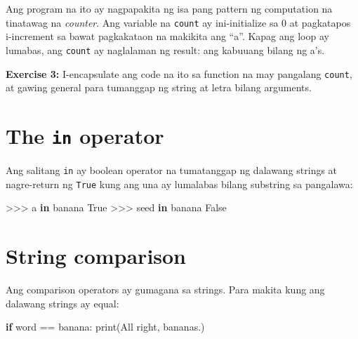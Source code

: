 \documentclass[10pt,]{book}
\newenvironment{Shaded}{}{}
\newcommand{\BuiltInTok}[1]{\textcolor[rgb]{0.00,0.50,0.00}{#1}}
\newcommand{\ControlFlowTok}[1]{\textcolor[rgb]{0.00,0.44,0.13}{\textbf{#1}}}
\newcommand{\KeywordTok}[1]{\textcolor[rgb]{0.00,0.44,0.13}{\textbf{#1}}}
\newcommand{\NormalTok}[1]{#1}
\newcommand{\OperatorTok}[1]{\textcolor[rgb]{0.40,0.40,0.40}{#1}}
\newcommand{\StringTok}[1]{\textcolor[rgb]{0.25,0.44,0.63}{#1}}
\newcommand{\VariableTok}[1]{\textcolor[rgb]{0.10,0.09,0.49}{#1}}
\begin{document}
Ang program na ito ay nagpapakita ng isa pang pattern ng computation na
tinatawag na \emph{counter}. Ang variable na \texttt{count} ay
ini-initialize sa 0 at pagkatapos i-increment sa bawat pagkakataon na
makikita ang ``a''. Kapag ang loop ay lumabas, ang \texttt{count} ay
naglalaman ng result: ang kabuuang bilang ng a's.


\textbf{Exercise 3:} I-encapsulate ang code na ito sa function na may
pangalang \texttt{count}, at gawing general para tumanggap ng string at
letra bilang arguments.

\section{\texorpdfstring{The \texttt{in}
operator}{The in operator}}\label{the-in-operator}

  

Ang salitang \texttt{in} ay boolean operator na tumatanggap ng dalawang
strings at nagre-return ng \texttt{True} kung ang una ay lumalabas
bilang substring sa pangalawa:

\begin{Shaded}
\begin{Highlighting}[]
\OperatorTok{\textgreater{}\textgreater{}\textgreater{}} \StringTok{\textquotesingle{}a\textquotesingle{}} \KeywordTok{in} \StringTok{\textquotesingle{}banana\textquotesingle{}}
\VariableTok{True}
\OperatorTok{\textgreater{}\textgreater{}\textgreater{}} \StringTok{\textquotesingle{}seed\textquotesingle{}} \KeywordTok{in} \StringTok{\textquotesingle{}banana\textquotesingle{}}
\VariableTok{False}
\end{Highlighting}
\end{Shaded}

\section{String comparison}\label{string-comparison}

 

Ang comparison operators ay gumagana sa strings. Para makita kung ang
dalawang strings ay equal:

\begin{Shaded}
\begin{Highlighting}[]
\ControlFlowTok{if}\NormalTok{ word }\OperatorTok{==} \StringTok{\textquotesingle{}banana\textquotesingle{}}\NormalTok{:}
    \BuiltInTok{print}\NormalTok{(}\StringTok{\textquotesingle{}All right, bananas.\textquotesingle{}}\NormalTok{)}
\end{Highlighting}
\end{Shaded}
\end{document}
